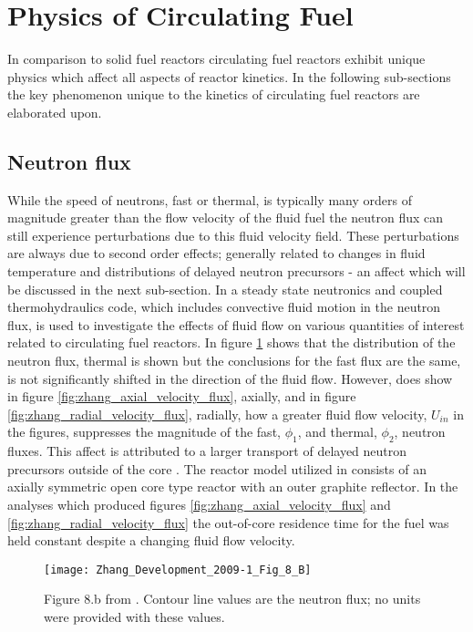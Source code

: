 \documentclass[review]{elsarticle}
\begin{document}
\section{Physics of Circulating Fuel} \label{sec:physics}
In comparison to solid fuel reactors circulating fuel reactors exhibit unique
physics which affect all aspects of reactor kinetics. In the following
sub-sections the key phenomenon unique to the kinetics of circulating fuel
reactors are elaborated upon.

\subsection{Neutron flux} \label{ssec:flux}
While the speed of neutrons, fast or thermal, is typically many orders of magnitude greater than
the flow velocity of the fluid fuel the neutron flux can still experience
perturbations due to this fluid velocity field. These perturbations are always
due to second order effects; generally related to changes in fluid temperature
and distributions of delayed neutron precursors - an affect which will be
discussed in the next sub-section. In \cite{zhang_development_2009-1} a steady
state neutronics and coupled thermohydraulics code, which includes convective
fluid motion in the neutron flux, is used to investigate the effects of fluid
flow on various quantities of interest related to circulating fuel reactors. In
figure \ref{fig:zhang_2d_flux} \cite{zhang_development_2009-1} shows that the
distribution of the neutron flux, thermal is shown but the conclusions for the fast flux are the same, is not significantly shifted in the direction
of the fluid flow. However, \cite{zhang_development_2009-1} does show in figure \ref{fig:zhang_axial_velocity_flux}, axially, and in figure \ref{fig:zhang_radial_velocity_flux}, radially, how a greater fluid flow
 velocity, $U_{in}$ in the figures, suppresses the magnitude of the fast, $\phi_{1}$, and thermal, $\phi_{2}$, neutron fluxes. This affect is
 attributed to a larger transport of delayed neutron precursors outside of the core \cite{zhang_development_2009-1}. The reactor model
 utilized in \cite{zhang_development_2009-1} consists of an axially symmetric
 open core type reactor with an outer graphite reflector. In the analyses which
 produced figures \ref{fig:zhang_axial_velocity_flux} and \ref{fig:zhang_radial_velocity_flux} the
 out-of-core residence time for the fuel was held constant despite a changing
 fluid flow velocity.

\begin{figure}[h]
   \centering
   \texttt{[image: Zhang\_Development\_2009-1\_Fig\_8\_B]}
   \caption{Figure 8.b from \cite{zhang_development_2009-1}. Contour line
    values are the neutron flux; no units were provided with these values.} 
   \label{fig:zhang_2d_flux}
\end{figure}
\end{document}
